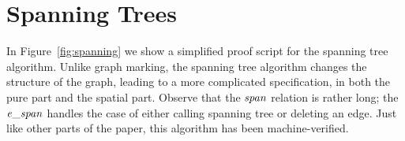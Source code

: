 
\appendix

\section{Spanning Trees}
\label{apx:spanning}



In Figure~\ref{fig:spanning} we show a simplified proof script for
the spanning tree algorithm.  Unlike graph marking, the spanning tree algorithm changes the
structure of the graph, leading to a more complicated specification,
in both the pure part and the spatial part. Observe that the $\mathit{span}$ relation is
rather long; the $\mathit{e\_span}$ handles the case of either calling spanning tree or deleting an edge.
Just like other parts of the paper, this algorithm has been machine-verified.

% 



